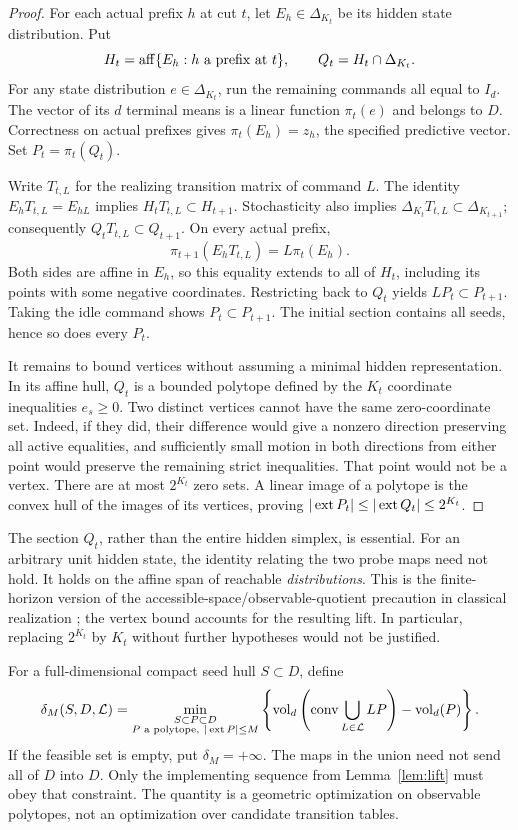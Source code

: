 \begin{proof}
For each actual prefix $h$ at cut $t$, let $E_h\in\Delta_{K_t}$ be
its hidden state distribution. Put
\[
 H_t=\operatorname{aff}\{E_h:h\text{ a prefix at }t\},\qquad
 Q_t=H_t\cap\Delta_{K_t}.
\]
For any state distribution $e\in\Delta_{K_t}$, run the remaining
commands all equal to $I_d$. The vector of its $d$ terminal means is a
linear function $\pi_t(e)$ and belongs to $D$. Correctness on actual
prefixes gives $\pi_t(E_h)=z_h$, the specified predictive vector.
Set $P_t=\pi_t(Q_t)$.

Write $T_{t,L}$ for the realizing transition matrix of command $L$.
The identity $E_hT_{t,L}=E_{hL}$ implies
$H_tT_{t,L}\subset H_{t+1}$. Stochasticity also implies
$\Delta_{K_t}T_{t,L}\subset\Delta_{K_{t+1}}$; consequently
$Q_tT_{t,L}\subset Q_{t+1}$. On every actual prefix,
\[
 \pi_{t+1}(E_hT_{t,L})=L\pi_t(E_h).
\]
Both sides are affine in $E_h$, so this equality extends to all of $H_t$,
including its points with some negative coordinates. Restricting back to
$Q_t$ yields $LP_t\subset P_{t+1}$. Taking the idle command shows
$P_t\subset P_{t+1}$. The initial section contains all seeds, hence so
does every $P_t$.

It remains to bound vertices without assuming a minimal hidden
representation. In its affine hull, $Q_t$ is a bounded polytope defined
by the $K_t$ coordinate inequalities $e_s\ge0$. Two distinct vertices
cannot have the same zero-coordinate set. Indeed, if they did, their
difference would give a nonzero direction preserving all active
equalities, and sufficiently small motion in both directions from
either point would preserve the remaining strict inequalities. That
point would not be a vertex. There are at most $2^{K_t}$ zero sets.
A linear image of a polytope is the convex hull of the images of its
vertices, proving $|\operatorname{ext} P_t|\le|\operatorname{ext} Q_t|\le2^{K_t}$.
\end{proof}

The section $Q_t$, rather than the entire hidden simplex, is essential.
For an arbitrary unit hidden state, the identity relating the two probe
maps need not hold. It holds on the affine span of reachable
\emph{distributions}. This is the finite-horizon version of the
accessible-space/observable-quotient precaution in classical realization
\cite[Section 4]{MW}; the vertex bound accounts for the resulting lift.
In particular, replacing $2^{K_t}$ by $K_t$ without further hypotheses
would not be justified.

For a full-dimensional compact seed hull $S\subset D$, define
\begin{equation}\label{eq:expansion}
 \delta_M(S,D,\mathcal L)=
 \min_{\substack{S\subset P\subset D\\P\text{ a polytope},\ |\operatorname{ext} P|\le M}}
 \left\{\operatorname{vol}_d\left(\operatorname{conv}\bigcup_{L\in\mathcal L}LP\right)
                  -\operatorname{vol}_d(P)\right\}.
\end{equation}
If the feasible set is empty, put $\delta_M=+\infty$.
The maps in the union need not send all of $D$ into $D$.
Only the implementing sequence from Lemma~\ref{lem:lift} must obey that
constraint. The quantity is a geometric optimization on observable
polytopes, not an optimization over candidate transition tables.

